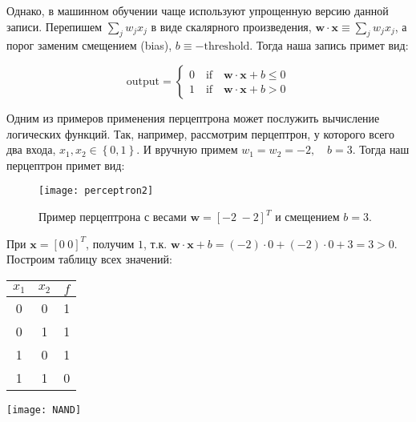 Однако, в машинном обучении чаще используют упрощенную версию данной записи. 
Перепишем $\sum_j w_j x_j$ в виде скалярного произведения, \hspace{20pt}
$\bm{w} \cdot \bm{x} \equiv \sum_j w_j x_j$, 
а порог заменим смещением (bias), $b \equiv -\text{threshold}$. Тогда наша запись примет вид:

\begin{equation*}
    \text{output} = \begin{cases}
        0 \quad \text{if} \quad \bm{w} \cdot \bm{x} + b \leq 0 \\
        1 \quad \text{if} \quad \bm{w} \cdot \bm{x} + b > 0 
    \end{cases}
\end{equation*}

Одним из примеров применения перцептрона может послужить вычисление логических функций.
Так, например, рассмотрим перцептрон, у которого всего два входа, $x_1, x_2 \in \left\{ 0, 1 \right\}$. 
И вручную примем $w_1 = w_2 = -2, \quad b = 3$. Тогда наш перцептрон примет вид:

\begin{figure}[h!]
    \centering
    \texttt{[image: perceptron2]}
    \caption{Пример перцептрона с весами $\bm{w} = \left[ -2 \hspace{3pt} -2 \right]^T$ и 
    смещением $b = 3$.}
    \label{fig:perceptron2}
\end{figure}

При $\bm{x} = \left[ 0 \hspace{3pt} 0 \right]^T$, получим $1$, т.к. 
$\bm{w} \cdot \bm{x} + b = (-2) \cdot 0 + (-2) \cdot 0 + 3 = 3 > 0$.
Построим таблицу всех значений:

\begin{minipage}{0.4\textwidth}
    \centering
    \renewcommand{\arraystretch}{1.5}
    \begin{tabular}{ccc}
        $x_1$ & $x_2$ & $f$ \\
        \midrule
        0 & 0 & 1 \\
        0 & 1 & 1 \\
        1 & 0 & 1 \\
        1 & 1 & 0 \\
    \end{tabular}
    \label{tab:perceptron-values}
\end{minipage}
\hspace{30pt}
\begin{minipage}{0.4\textwidth}
    \texttt{[image: NAND]}
    \label{fig:NAND}
\end{minipage}\\

